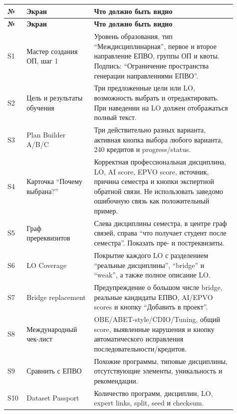 \documentclass[twoside,11pt]{article}
\begin{document}
\begin{longtable}{p{0.06\linewidth}p{0.27\linewidth}p{0.58\linewidth}}
\toprule
\textbf{№} & \textbf{Экран} & \textbf{Что должно быть видно}\\
\midrule
\endfirsthead
\toprule
\textbf{№} & \textbf{Экран} & \textbf{Что должно быть видно}\\
\midrule
\endhead
S1 & Мастер создания ОП, шаг 1 &
Уровень образования, тип ``Междисциплинарная'', первое и второе направление ЕПВО, группы ОП и квоты. Подпись: ``Ограничение пространства генерации направлениями ЕПВО''.\\

S2 & Цель и результаты обучения &
Три предложенные цели или LO, возможность выбрать и отредактировать. При наведении на LO должен отображаться полный текст.\\

S3 & Plan Builder A/B/C &
Три действительно разных варианта, активная кнопка выбора любого варианта, 240 кредитов и progress/status.\\

S4 & Карточка ``Почему выбрана?'' &
Корректная профессиональная дисциплина, LO, AI score, EPVO score, источник, причина семестра и кнопки экспертной обратной связи. Не использовать заведомо ошибочную связь как положительный пример.\\

S5 & Граф пререквизитов &
Слева дисциплины семестра, в центре граф связей, справа ``что получает студент после семестра''. Показать пре- и постреквизиты.\\

S6 & LO Coverage &
Покрытие каждого LO с разделением ``реальные дисциплины'', ``bridge'' и ``weak'', а также полное описание LO.\\

S7 & Bridge replacement &
Предупреждение о большом числе bridge, реальные кандидаты ЕПВО, AI/EPVO scores и кнопку ``Добавить в проект''.\\

S8 & Международный чек-лист &
OBE/ABET-style/CDIO/Tuning, общий score, выявленные нарушения и кнопку автоматического исправления последовательности/кредитов.\\

S9 & Сравнить с ЕПВО &
Похожие программы, типовые дисциплины, отсутствующие элементы, уникальность и рекомендации.\\

S10 & Dataset Passport &
Количество программ, дисциплин, LO, expert links, split, seed и checksum.\\


\end{longtable}
\end{document}

